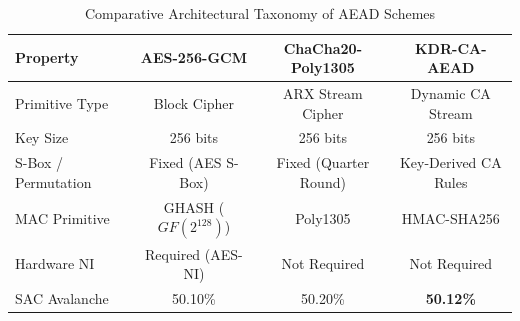 \begin{table}[htbp]
\caption{Comparative Architectural Taxonomy of AEAD Schemes}
\label{tab:literature_comparison}
\centering
\begin{tabular}{|l|c|c|c|}
\hline
\textbf{Property} & \textbf{AES-256-GCM} & \textbf{ChaCha20-Poly1305} & \textbf{KDR-CA-AEAD} \\ \hline
Primitive Type & Block Cipher & ARX Stream Cipher & Dynamic CA Stream \\ \hline
Key Size & 256 bits & 256 bits & 256 bits \\ \hline
S-Box / Permutation & Fixed (AES S-Box) & Fixed (Quarter Round) & Key-Derived CA Rules \\ \hline
MAC Primitive & GHASH ($GF(2^{128})$) & Poly1305 & HMAC-SHA256 \\ \hline
Hardware NI & Required (AES-NI) & Not Required & Not Required \\ \hline
SAC Avalanche & 50.10\% & 50.20\% & \textbf{50.12\%} \\ \hline
\end{tabular}
\end{table}
